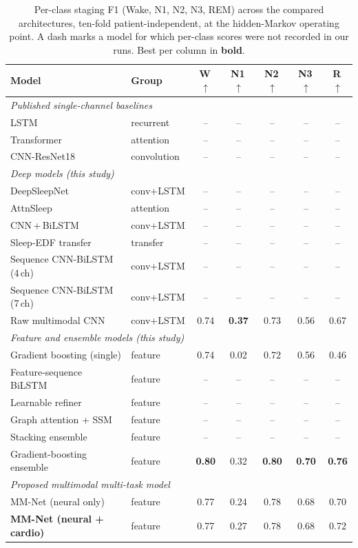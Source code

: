 \documentclass[journal]{IEEEtran}
\begin{document}
\begin{table}[t]
\caption{Per-class staging F1 (Wake, N1, N2, N3, REM) across the compared architectures,
ten-fold patient-independent, at the hidden-Markov operating point. A dash marks a model for
which per-class scores were not recorded in our runs. Best per column in \textbf{bold}.}
\label{tab:perclass}
\centering
\setlength{\tabcolsep}{8pt}
\begin{tabular}{llccccc}
\toprule
Model & Group & W\,$\uparrow$ & N1\,$\uparrow$ & N2\,$\uparrow$ & N3\,$\uparrow$ & R\,$\uparrow$ \\
\midrule
\multicolumn{7}{l}{\emph{Published single-channel baselines}~\cite{maiti2026isleeps}}\\
LSTM                       & recurrent   & -- & -- & -- & -- & -- \\
Transformer                & attention   & -- & -- & -- & -- & -- \\
CNN-ResNet18               & convolution & -- & -- & -- & -- & -- \\
\midrule
\multicolumn{7}{l}{\emph{Deep models (this study)}}\\
DeepSleepNet~\cite{supratak2017deepsleepnet} & conv+LSTM & -- & -- & -- & -- & -- \\
AttnSleep~\cite{eldele2021attnsleep}         & attention & -- & -- & -- & -- & -- \\
CNN\,+\,BiLSTM             & conv+LSTM   & -- & -- & -- & -- & -- \\
Sleep-EDF transfer         & transfer    & -- & -- & -- & -- & -- \\
Sequence CNN-BiLSTM (4\,ch) & conv+LSTM  & -- & -- & -- & -- & -- \\
Sequence CNN-BiLSTM (7\,ch) & conv+LSTM  & -- & -- & -- & -- & -- \\
Raw multimodal CNN         & conv+LSTM   & 0.74 & \textbf{0.37} & 0.73 & 0.56 & 0.67 \\
\midrule
\multicolumn{7}{l}{\emph{Feature and ensemble models (this study)}}\\
Gradient boosting (single) & feature     & 0.74 & 0.02 & 0.72 & 0.56 & 0.46 \\
Feature-sequence BiLSTM    & feature     & -- & -- & -- & -- & -- \\
Learnable refiner          & feature     & -- & -- & -- & -- & -- \\
Graph attention + SSM      & feature     & -- & -- & -- & -- & -- \\
Stacking ensemble          & feature     & -- & -- & -- & -- & -- \\
Gradient-boosting ensemble & feature     & \textbf{0.80} & 0.32 & \textbf{0.80} & \textbf{0.70} & \textbf{0.76} \\
\midrule
\multicolumn{7}{l}{\emph{Proposed multimodal multi-task model}}\\
MM-Net (neural only)       & feature     & 0.77 & 0.24 & 0.78 & 0.68 & 0.70 \\
\textbf{MM-Net (neural + cardio)} & feature & 0.77 & 0.27 & 0.78 & 0.68 & 0.72 \\
\bottomrule
\end{tabular}
\end{table}
\end{document}
